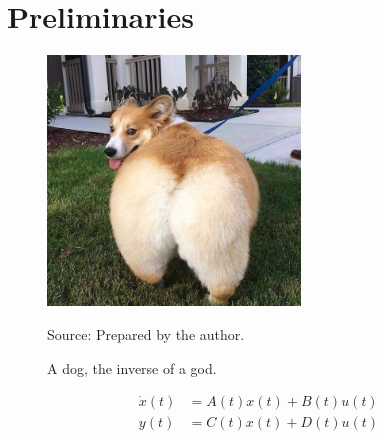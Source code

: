 \chapter{Preliminaries} \label{sec: Preliminaries}

\lipsum[1-3]

\begin{figure}[htb!] \centering
    \caption{A dog, the inverse of a god.}

    \includegraphics[width=0.6\textwidth]{imgs/dog.jpg}

    Source: Prepared by the author.
    \label{fig: Corgi}
\end{figure}

\lipsum[4-5]
\begin{align*}
    \dot{x}(t) &= A(t) x(t) + B(t) u(t) \\
          y(t) &= C(t) x(t) + D(t) u(t)
\end{align*}

\lipsum[6-8]